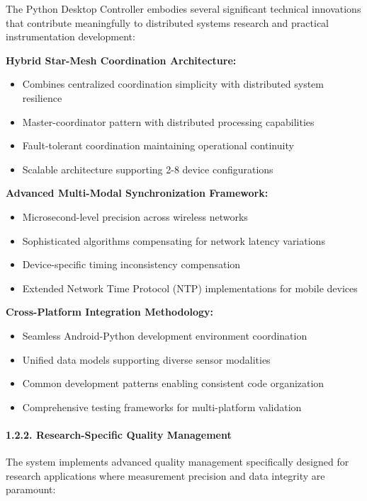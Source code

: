 \documentclass[11pt,a4paper]{article}
\begin{document}
The Python Desktop Controller embodies several significant technical innovations that contribute meaningfully to
distributed systems research and practical instrumentation development:

\textbf{Hybrid Star-Mesh Coordination Architecture:}

\begin{itemize}
\item Combines centralized coordination simplicity with distributed system resilience
\item Master-coordinator pattern with distributed processing capabilities
\item Fault-tolerant coordination maintaining operational continuity
\item Scalable architecture supporting 2-8 device configurations

\end{itemize}
\textbf{Advanced Multi-Modal Synchronization Framework:}

\begin{itemize}
\item Microsecond-level precision across wireless networks
\item Sophisticated algorithms compensating for network latency variations
\item Device-specific timing inconsistency compensation
\item Extended Network Time Protocol (NTP) implementations for mobile devices

\end{itemize}
\textbf{Cross-Platform Integration Methodology:}

\begin{itemize}
\item Seamless Android-Python development environment coordination
\item Unified data models supporting diverse sensor modalities
\item Common development patterns enabling consistent code organization
\item Comprehensive testing frameworks for multi-platform validation

\end{itemize}
\paragraph{1.2.2. Research-Specific Quality Management}

The system implements advanced quality management specifically designed for research applications where measurement
precision and data integrity are paramount:
\end{document}
